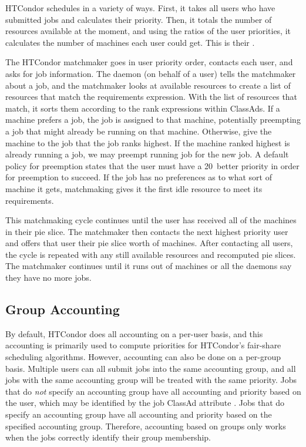 HTCondor schedules in a variety of ways.
First, it takes all users who have submitted jobs and calculates their priority.
Then, it totals the number of resources available at the moment,
and using the ratios of the user priorities,
it calculates the number of machines each user could get.
This is their .

The HTCondor matchmaker goes in user priority order, 
contacts each user, and asks for job information. 
The  daemon (on behalf of a user)
tells the matchmaker about a job,
and the matchmaker looks at available resources
to create a list of resources that match the requirements expression.
With the list of resources that match,
it sorts them according to the rank expressions within ClassAds.
If a machine prefers a job, the job is assigned to that machine,
potentially preempting a job that might already be running on that machine.
Otherwise, give the machine to the job that the job ranks highest.
If the machine ranked highest is already running a job,
we may preempt running job
for the new job. 
A default policy for preemption states that the user must
have a 20\Percent\  better priority in order for preemption to succeed.
If the job has no preferences as to what sort of machine it gets,
matchmaking gives it the first idle resource to meet its requirements.

This matchmaking cycle continues until the user has received all of the
machines in their pie slice.
The matchmaker then contacts the next highest
priority user and offers that user their pie slice worth of machines.
After contacting all users,
the cycle is repeated with any still available resources
and recomputed pie slices.
The matchmaker continues  
until it runs out of machines or all the  daemons
say they have no more jobs. 

\subsection{\label{sec:group-accounting}Group Accounting}

By default, HTCondor does all accounting on a per-user basis, and this
accounting is primarily used to compute priorities for HTCondor's
fair-share scheduling algorithms. 
However, accounting can also be done on a per-group basis.
Multiple users can all submit jobs into the same accounting group,
and all jobs with the same accounting group
will be treated with the same priority.
Jobs that do \emph{not} specify an accounting group have 
all accounting and priority based on the user, 
which may be identified by the job ClassAd attribute .
Jobs that do specify an accounting group have 
all accounting and priority based on the specified accounting group.
Therefore, accounting based on groups only works when
the jobs correctly identify their group membership.

